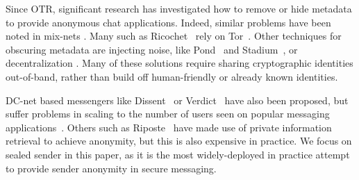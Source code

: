 Since OTR, significant research has investigated how to remove or hide metadata
to provide anonymous chat applications.  Indeed, similar problems have been noted in mix-nets \cite{leibowitz2019no}. Many such as
Ricochet~\cite{ricochet} rely on Tor~\cite{tor_two}.  Other techniques for obscuring metadata are injecting noise, like
Pond~\cite{pond} and Stadium~\cite{tyagi2017stadium}, or decentralization \cite{kwon2017atom}.  Many of these solutions require
sharing cryptographic identities out-of-band, rather than build off human-friendly
or already known identities.

DC-net based messengers like Dissent~\cite{CF10} or Verdict~\cite{verdict} have also been proposed, but suffer
problems in scaling to the number of users seen on popular messaging
applications~\cite{U+15,HLZZ15}. Others such as
Riposte~\cite{CBM15} have made use of private information
retrieval to achieve anonymity, but this is also expensive in practice.
We focus on sealed sender in this paper, as it is the most widely-deployed
in practice attempt to provide sender anonymity in secure messaging.


